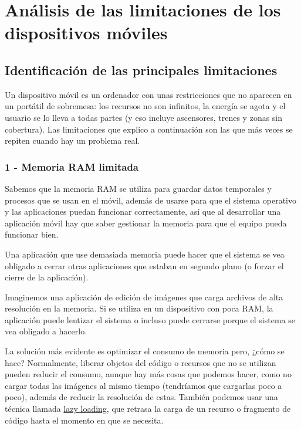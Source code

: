 \section{Análisis de las limitaciones de los dispositivos móviles}

\subsection{Identificación de las principales limitaciones}

Un dispositivo móvil es un ordenador con unas restricciones que no aparecen en un portátil de sobremesa: los recursos no son infinitos, la energía se agota y el usuario se lo lleva a todas partes (y eso incluye ascensores, trenes y zonas sin cobertura). Las limitaciones que explico a continuación son las que más veces se repiten cuando hay un problema real.

\subsubsection*{1 - Memoria RAM limitada}

Sabemos que la memoria RAM se utiliza para guardar datos temporales y procesos que se usan en el móvil, además de usarse para que el sistema operativo y las aplicaciones puedan funcionar correctamente, así que al desarrollar una aplicación móvil hay que saber gestionar la memoria para que el equipo pueda funcionar bien.

Una aplicación que use demasiada memoria puede hacer que el sistema se vea obligado a cerrar otras aplicaciones que estaban en segundo plano (o forzar el cierre de la aplicación).

Imaginemos una aplicación de edición de imágenes que carga archivos de alta resolución en la memoria. Si se utiliza en un dispositivo con poca RAM, la aplicación puede lentizar el sistema o incluso puede cerrarse porque el sistema se vea obligado a hacerlo.

La solución más evidente es optimizar el consumo de memoria pero, ¿cómo se hace? Normalmente, liberar objetos del código o recursos que no se utilizan pueden reducir el consumo, aunque hay más cosas que podemos hacer, como no cargar todas las imágenes al mismo tiempo (tendríamos que cargarlas poco a poco), además de reducir la resolución de estas. También podemos usar una técnica llamada \href{https://es.wikipedia.org/wiki/Lazy_loading}{lazy loading}, que retrasa la carga de un recurso o fragmento de código hasta el momento en que se necesita.

